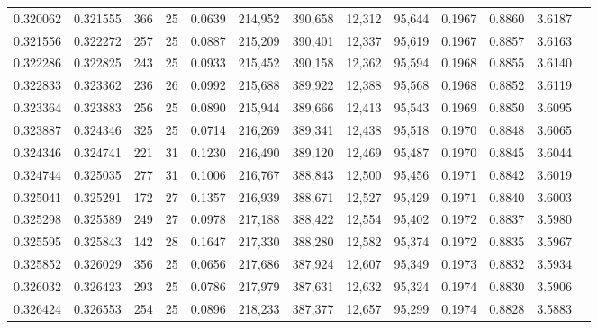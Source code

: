 \begin{tabular}{rrrrrrrrrrrrr}
0.320062 & 0.321555 &   366 &  25 &                                     0.0639 & 214,952 & 390,658 &  12,312 &  95,644 & 0.1967 & 0.8860 & 3.6187 \\
0.321556 & 0.322272 &   257 &  25 &                                     0.0887 & 215,209 & 390,401 &  12,337 &  95,619 & 0.1967 & 0.8857 & 3.6163 \\
0.322286 & 0.322825 &   243 &  25 &                                     0.0933 & 215,452 & 390,158 &  12,362 &  95,594 & 0.1968 & 0.8855 & 3.6140 \\
0.322833 & 0.323362 &   236 &  26 &                                     0.0992 & 215,688 & 389,922 &  12,388 &  95,568 & 0.1968 & 0.8852 & 3.6119 \\
0.323364 & 0.323883 &   256 &  25 &                                     0.0890 & 215,944 & 389,666 &  12,413 &  95,543 & 0.1969 & 0.8850 & 3.6095 \\
0.323887 & 0.324346 &   325 &  25 &                                     0.0714 & 216,269 & 389,341 &  12,438 &  95,518 & 0.1970 & 0.8848 & 3.6065 \\
0.324346 & 0.324741 &   221 &  31 &                                     0.1230 & 216,490 & 389,120 &  12,469 &  95,487 & 0.1970 & 0.8845 & 3.6044 \\
0.324744 & 0.325035 &   277 &  31 &                                     0.1006 & 216,767 & 388,843 &  12,500 &  95,456 & 0.1971 & 0.8842 & 3.6019 \\
0.325041 & 0.325291 &   172 &  27 &                                     0.1357 & 216,939 & 388,671 &  12,527 &  95,429 & 0.1971 & 0.8840 & 3.6003 \\
0.325298 & 0.325589 &   249 &  27 &                                     0.0978 & 217,188 & 388,422 &  12,554 &  95,402 & 0.1972 & 0.8837 & 3.5980 \\
0.325595 & 0.325843 &   142 &  28 &                                     0.1647 & 217,330 & 388,280 &  12,582 &  95,374 & 0.1972 & 0.8835 & 3.5967 \\
0.325852 & 0.326029 &   356 &  25 &                                     0.0656 & 217,686 & 387,924 &  12,607 &  95,349 & 0.1973 & 0.8832 & 3.5934 \\
0.326032 & 0.326423 &   293 &  25 &                                     0.0786 & 217,979 & 387,631 &  12,632 &  95,324 & 0.1974 & 0.8830 & 3.5906 \\
0.326424 & 0.326553 &   254 &  25 &                                     0.0896 & 218,233 & 387,377 &  12,657 &  95,299 & 0.1974 & 0.8828 & 3.5883 \\

\end{tabular}
